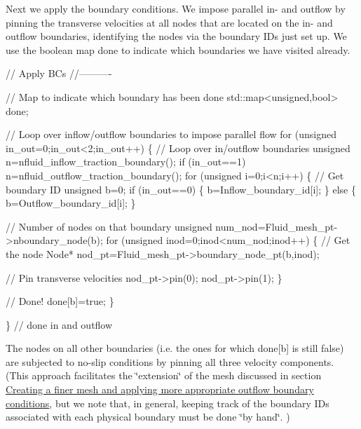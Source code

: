 Next we apply the boundary conditions. We impose parallel in-\/ and outflow by pinning the transverse velocities at all nodes that are located on the in-\/ and outflow boundaries, identifying the nodes via the boundary I\+Ds just set up. We use the boolean map {\ttfamily done} to indicate which boundaries we have visited already.


\begin{DoxyCodeInclude}
 
 \textcolor{comment}{// Apply BCs}
 \textcolor{comment}{//----------}
 
 \textcolor{comment}{// Map to indicate which boundary has been done}
 std::map<unsigned,bool> done; 
  
 \textcolor{comment}{// Loop over inflow/outflow boundaries to impose parallel flow}
 \textcolor{keywordflow}{for} (\textcolor{keywordtype}{unsigned} in\_out=0;in\_out<2;in\_out++)
  \{
   \textcolor{comment}{// Loop over in/outflow boundaries}
   \textcolor{keywordtype}{unsigned} n=nfluid\_inflow\_traction\_boundary();
   \textcolor{keywordflow}{if} (in\_out==1) n=nfluid\_outflow\_traction\_boundary();
   \textcolor{keywordflow}{for} (\textcolor{keywordtype}{unsigned} i=0;i<n;i++)
    \{
     \textcolor{comment}{// Get boundary ID}
     \textcolor{keywordtype}{unsigned} b=0;
     \textcolor{keywordflow}{if} (in\_out==0)
      \{
       b=Inflow\_boundary\_id[i];
      \}
     \textcolor{keywordflow}{else}
      \{
       b=Outflow\_boundary\_id[i];
      \}

     \textcolor{comment}{// Number of nodes on that boundary}
     \textcolor{keywordtype}{unsigned} num\_nod=Fluid\_mesh\_pt->nboundary\_node(b);
     \textcolor{keywordflow}{for} (\textcolor{keywordtype}{unsigned} inod=0;inod<num\_nod;inod++)
      \{
       \textcolor{comment}{// Get the node}
       Node* nod\_pt=Fluid\_mesh\_pt->boundary\_node\_pt(b,inod);
       
       \textcolor{comment}{// Pin transverse velocities}
       nod\_pt->pin(0);
       nod\_pt->pin(1);
      \}
     
     \textcolor{comment}{// Done!}
     done[b]=\textcolor{keyword}{true};
    \}

  \} \textcolor{comment}{// done in and outflow}

\end{DoxyCodeInclude}


The nodes on all other boundaries (i.\+e. the ones for which {\ttfamily done}\mbox{[}b\mbox{]} is still {\ttfamily false}) are subjected to no-\/slip conditions by pinning all three velocity components. (This approach facilitates the \char`\"{}extension\char`\"{} of the mesh discussed in section \hyperlink{index_finer_mesh}{Creating a finer mesh and applying more appropriate outflow boundary conditions}, but we note that, in general, keeping track of the boundary I\+Ds associated with each physical boundary must be done \char`\"{}by hand\char`\"{}. )



